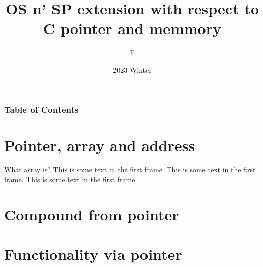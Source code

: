\documentclass{beamer}
\title{OS n' SP extension with respect to C pointer and memmory}
\author{E}
\institute{University of Birmingham}
\date{2023 Winter}
\begin{document}
\frame{\titlepage}

\begin{frame}
    \frametitle{Table of Contents}
    \tableofcontents
\end{frame}


\section{Pointer, array and address}
\begin{frame}{What array is?}
This is some text in the first frame. This is some text in the first frame. This is some text in the first frame.
\end{frame}



\section{Compound from pointer}

\section{Functionality via pointer}
\end{document}
